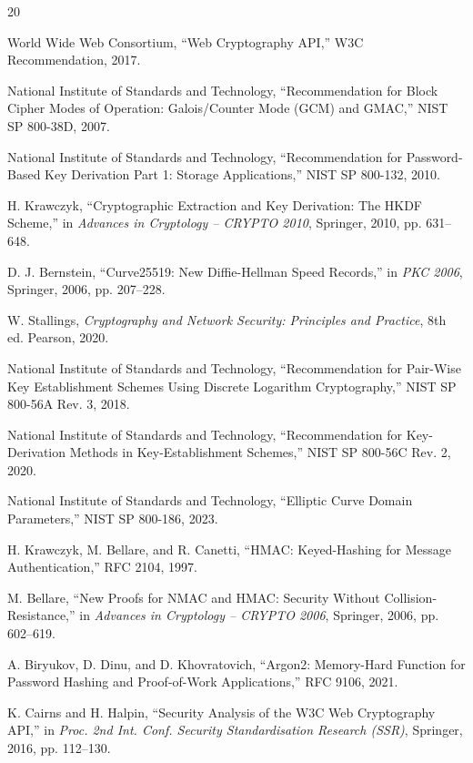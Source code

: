 \documentclass[conference]{IEEEtran}
\begin{document}
\begin{thebibliography}{20}

World Wide Web Consortium, ``Web Cryptography API,'' W3C Recommendation, 2017.

National Institute of Standards and Technology, ``Recommendation for Block Cipher Modes of Operation: Galois/Counter Mode (GCM) and GMAC,'' NIST SP 800-38D, 2007.

National Institute of Standards and Technology, ``Recommendation for Password-Based Key Derivation Part 1: Storage Applications,'' NIST SP 800-132, 2010.

H. Krawczyk, ``Cryptographic Extraction and Key Derivation: The HKDF Scheme,'' in \textit{Advances in Cryptology -- CRYPTO 2010}, Springer, 2010, pp. 631--648.

D. J. Bernstein, ``Curve25519: New Diffie-Hellman Speed Records,'' in \textit{PKC 2006}, Springer, 2006, pp. 207--228.

W. Stallings, \textit{Cryptography and Network Security: Principles and Practice}, 8th ed. Pearson, 2020.

National Institute of Standards and Technology, ``Recommendation for Pair-Wise Key Establishment Schemes Using Discrete Logarithm Cryptography,'' NIST SP 800-56A Rev. 3, 2018.

National Institute of Standards and Technology, ``Recommendation for Key-Derivation Methods in Key-Establishment Schemes,'' NIST SP 800-56C Rev. 2, 2020.

National Institute of Standards and Technology, ``Elliptic Curve Domain Parameters,'' NIST SP 800-186, 2023.

H. Krawczyk, M. Bellare, and R. Canetti, ``HMAC: Keyed-Hashing for Message Authentication,'' RFC 2104, 1997.

M. Bellare, ``New Proofs for NMAC and HMAC: Security Without Collision-Resistance,'' in \textit{Advances in Cryptology -- CRYPTO 2006}, Springer, 2006, pp. 602--619.

A. Biryukov, D. Dinu, and D. Khovratovich, ``Argon2: Memory-Hard Function for Password Hashing and Proof-of-Work Applications,'' RFC 9106, 2021.

K. Cairns and H. Halpin, ``Security Analysis of the W3C Web Cryptography API,'' in \textit{Proc. 2nd Int. Conf. Security Standardisation Research (SSR)}, Springer, 2016, pp. 112--130.


\end{thebibliography}
\end{document}
